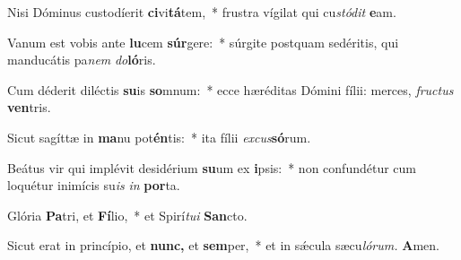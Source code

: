 \item Nisi Dóminus custodíerit \textbf{ci}vi\textbf{tá}tem,~* frustra vígilat qui cu\tinyhspace\textit{stódit} \textbf{e}am.
\item Vanum est vobis ante \textbf{lu}cem \textbf{súr}gere:~* súrgite postquam sedéritis, qui manducátis pa\tinyhspace\textit{nem} \textit{do}\textbf{ló}ris.
\item Cum déderit diléctis \textbf{su}is \textbf{so}mnum:~* ecce hæréditas Dómini fílii: merces, \textit{fructus} \textbf{ven}tris.
\item Sicut sagíttæ in \textbf{ma}nu pot\textbf{én}tis:~* ita fílii \textit{excus}\textbf{só}rum.
\item Beátus vir qui implévit desidérium \textbf{su}um ex \textbf{i}psis:~* non confundétur cum loquétur inimícis su\tinyhspace\textit{is} \textit{in} \textbf{por}ta.
\item Glória \textbf{Pa}tri, et \textbf{Fí}lio,~* et Spirí\tinyhspace\textit{tu}\textit{i} \textbf{San}cto.
\item Sicut erat in princípio, et \textbf{nunc,} et \textbf{sem}per,~* et in sǽcula sæcu\tinyhspace\textit{lórum.} \textbf{A}men.

